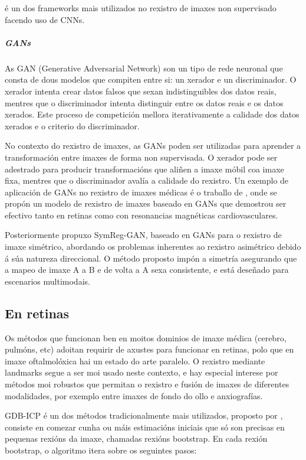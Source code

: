 \cite{Balakrishnan_2019voxelmorph} é un dos frameworks mais utilizados no rexistro de imaxes non supervisado facendo uso de CNNs.

\subparagraph{GANs}
\label{subparagraph:GANs}

As \gls{GAN} (Generative Adversarial Network) son un tipo de rede neuronal que consta de dous modelos que compiten entre si: un xerador e un discriminador. O xerador intenta crear datos falsos que sexan indistinguibles dos datos reais, mentres que o discriminador intenta distinguir entre os datos reais e os datos xerados. Este proceso de competición mellora iterativamente a calidade dos datos xerados e o criterio do discriminador.

No contexto do rexistro de imaxes, as GANs poden ser utilizadas para aprender a transformación entre imaxes de forma non supervisada. O xerador pode ser adestrado para producir transformacións que aliñen a imaxe móbil coa imaxe fixa, mentres que o discriminador avalía a calidade do rexistro.
Un exemplo de aplicación de GANs no rexistro de imaxes médicas é o traballo de \cite{mahapatra2019ganbasedmedicalimage}, onde se propón un modelo de rexistro de imaxes baseado en GANs que demostrou ser efectivo tanto en retinas como con resonancias magnéticas cardiovasculares.

Posteriormente \cite{gan2} propuxo SymReg-GAN, baseado en GANs para o rexistro de imaxe simétrico, abordando os problemas inherentes ao rexistro asimétrico debido á súa natureza direccional.
 O método proposto impón a simetría asegurando que a mapeo de imaxe A a B e de volta a A sexa consistente, e está deseñado para escenarios multimodais.

\subsection{En retinas}
\label{subsec:Retinas}

Os métodos que funcionan ben en moitos dominios de imaxe médica (cerebro, pulmóns, etc) 
adoitan requirir de axustes para funcionar en retinas, polo que en imaxe oftalmolóxica hai un estado do arte paralelo.
O rexistro mediante landmarks segue a ser moi usado neste contexto, e hay especial interese por métodos moi robustos que permitan
 o rexistro e fusión de imaxes de diferentes modalidades, por exemplo entre imaxes de fondo do ollo e anxiografías.

\gls{GDB-ICP} é un dos métodos tradicionalmente mais utilizados, proposto por \cite{GDB-ICP}, consiste en
 comezar cunha ou máis estimacións iniciais que só son precisas en pequenas rexións da imaxe, chamadas rexións bootstrap. 
 En cada rexión bootstrap, o algoritmo itera sobre os seguintes pasos: 
 
